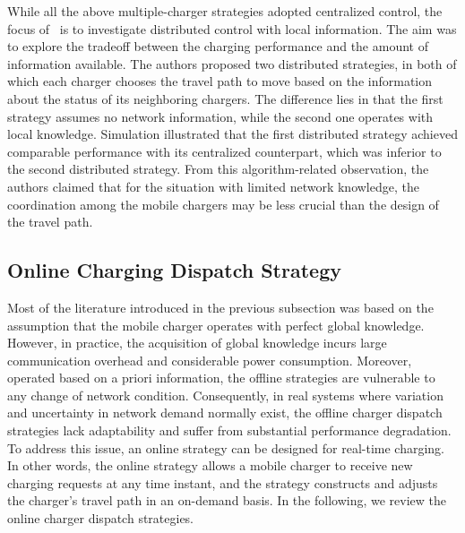 \documentclass[twocolumn,10pt]{IEEEtran}
\begin{document}
While all the above multiple-charger strategies adopted centralized control, the focus of~\cite{A2013Madhja} is to investigate distributed control with local information. The aim was to explore the tradeoff between the charging performance and the amount of information available. The authors proposed two distributed strategies, in both of which each charger chooses the travel path to move based on the information about the status of its neighboring chargers.  The difference lies in that the first strategy assumes no network information, while the second one operates with local knowledge. Simulation illustrated that the first distributed strategy achieved comparable performance with its centralized counterpart, which was inferior to the second distributed strategy. From this algorithm-related observation, the authors claimed that for the situation with limited network knowledge, the coordination among the mobile chargers may be less crucial than the design of the travel path.

 

\subsection{Online Charging Dispatch Strategy}

Most of the literature introduced in the previous subsection was based on the assumption that the mobile charger operates with perfect global knowledge. However, in practice, the acquisition of global knowledge incurs large communication overhead and considerable power consumption. Moreover, operated based on a priori information, the offline strategies are vulnerable to any change of network condition. Consequently, in real systems where variation and uncertainty in network demand normally exist, the offline charger dispatch strategies lack adaptability and suffer from substantial performance degradation. To address this issue, an online strategy can be designed for real-time charging. In other words, the online strategy allows a mobile charger to receive new charging requests at any time instant, and the strategy constructs and adjusts the charger's travel path in an on-demand basis. In the following, we review the online charger dispatch strategies. 



    
\end{document}
